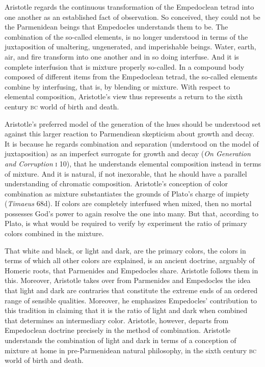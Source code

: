 Aristotle regards the continuous transformation of the Empedoclean tetrad into one another as an established fact of observation. So conceived, they could not be the Parmenidean beings that Empedocles understands them to be. The combination of the so-called elements, is no longer understood in terms of the juxtaposition of unaltering, ungenerated, and imperishable beings. Water, earth, air, and fire transform into one another and in so doing interfuse. And it is complete interfusion that is mixture properly so-called. In a compound body composed of different items from the Empedoclean tetrad, the so-called elements combine by interfusing, that is, by blending or mixture. With respect to elemental composition, Aristotle's view thus represents a return to the sixth century \textsc{bc} world of birth and death.

Aristotle's preferred model of the generation of the hues should be understood set against this larger reaction to Parmendiean skepticism about growth and decay. It is because he regards combination and separation (understood on the model of juxtaposition) as an imperfect surrogate for growth and decay (\emph{On Generation and Corruption} \textsc{i} 10), that he understands elemental composition instead in terms of mixture. And it is natural, if not inexorable, that he should have a parallel understanding of chromatic composition. Aristotle's conception of color combination as mixture substantiates the grounds of Plato's charge of impiety (\emph{Timaeus} 68d). If colors are completely interfused when mixed, then no mortal possesses God's power to again resolve the one into many. But that, according to Plato, is what would be required to verify by experiment the ratio of primary colors combined in the mixture.

That white and black, or light and dark, are the primary colors, the colors in terms of which all other colors are explained, is an ancient doctrine, arguably of Homeric roots, that Parmenides and Empedocles share. Aristotle follows them in this. Moreover, Aristotle takes over from Parmenides and Empedocles the idea that light and dark are contraries that constitute the extreme ends of an ordered range of sensible qualities. Moreover, he emphasizes Empedocles' contribution to this tradition in claiming that it is the ratio of light and dark when combined that determines an intermediary color. Aristotle, however, departs from Empedoclean doctrine precisely in the method of combination. Aristotle understands the combination of light and dark in terms of a conception of mixture at home in pre-Parmenidean natural philosophy, in the sixth century \textsc{bc} world of birth and death. 

